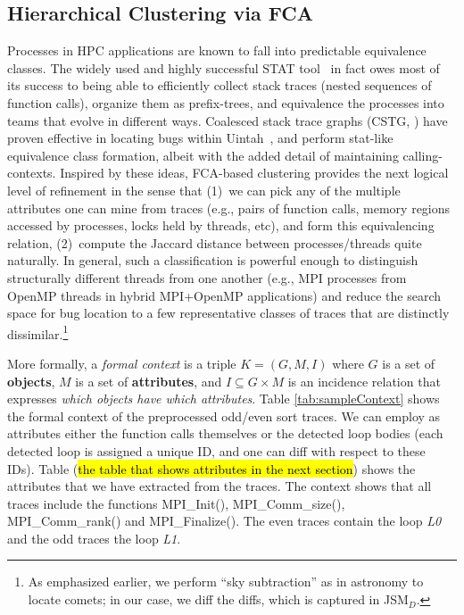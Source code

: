 \subsection{Hierarchical Clustering via FCA}
Processes in HPC applications are known to fall into predictable equivalence classes.
%
The widely used and highly successful STAT tool~\cite{stat} in fact owes most of its
success to being able to efficiently collect stack traces (nested sequences of function
calls), organize them as prefix-trees, and equivalence the processes into teams that
evolve in different ways.
%
Coalesced stack trace graphs (CSTG, \cite{cstg-journal-paper}) have proven effective in
locating bugs within Uintah~\cite{uintah}, and perform stat-like equivalence class formation,
albeit with the added detail of maintaining calling-contexts.
%
Inspired by these ideas, FCA-based clustering provides the next logical level of refinement
in the sense that (1)~we can pick any of the multiple attributes one can mine from traces (e.g.,
pairs of function calls, memory regions accessed by processes, locks held by threads, etc), and
form this equivalencing relation, (2)~compute the Jaccard distance between processes/threads
quite naturally.
%
In general,
such a classification is powerful enough to
distinguish structurally different threads from one another
(e.g., MPI processes from OpenMP threads in hybrid MPI+OpenMP applications)
and reduce the search space for bug location to a few representative classes of traces that
are distinctly dissimilar.\footnote{As emphasized earlier, we perform ``sky subtraction'' as
  in astronomy to locate comets; in our case, we diff the diffs, which is
  captured in JSM$_{D}$.}

More formally,
a \textit{formal context} is a triple $K = (G, M, I)$
where $G$ is a set of \textbf{objects},
$M$ is a set of \textbf{attributes},
and $I \subseteq G \times M$ is an incidence relation that expresses
\textit{which objects have which attributes}.
Table \ref{tab:sampleContext} shows the formal context of the preprocessed odd/even sort traces.
%
We can employ as attributes either the function calls themselves or the detected loop bodies
(each detected loop is assigned a unique ID, and one can diff with respect to these IDs).
%
Table (\hl{the table that shows attributes in the next section})
shows the attributes that we have extracted from the traces.
The context shows that all traces include the functions MPI\_Init(),
MPI\_Comm\_size(), MPI\_Comm\_rank() and MPI\_Finalize().
The even traces contain the loop \textit{L0} and the odd traces the loop \textit{L1}.
%

